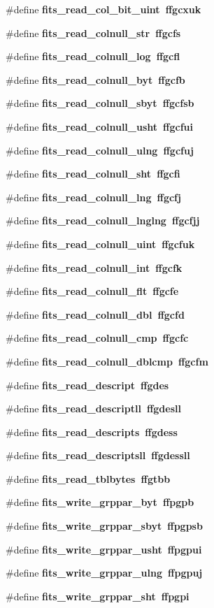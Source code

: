 \begin{CompactItemize}
\item 
\#define \bf{fits\_\-read\_\-col\_\-bit\_\-uint}~ffgcxuk
\item 
\#define \bf{fits\_\-read\_\-colnull\_\-str}~ffgcfs
\item 
\#define \bf{fits\_\-read\_\-colnull\_\-log}~ffgcfl
\item 
\#define \bf{fits\_\-read\_\-colnull\_\-byt}~ffgcfb
\item 
\#define \bf{fits\_\-read\_\-colnull\_\-sbyt}~ffgcfsb
\item 
\#define \bf{fits\_\-read\_\-colnull\_\-usht}~ffgcfui
\item 
\#define \bf{fits\_\-read\_\-colnull\_\-ulng}~ffgcfuj
\item 
\#define \bf{fits\_\-read\_\-colnull\_\-sht}~ffgcfi
\item 
\#define \bf{fits\_\-read\_\-colnull\_\-lng}~ffgcfj
\item 
\#define \bf{fits\_\-read\_\-colnull\_\-lnglng}~ffgcfjj
\item 
\#define \bf{fits\_\-read\_\-colnull\_\-uint}~ffgcfuk
\item 
\#define \bf{fits\_\-read\_\-colnull\_\-int}~ffgcfk
\item 
\#define \bf{fits\_\-read\_\-colnull\_\-flt}~ffgcfe
\item 
\#define \bf{fits\_\-read\_\-colnull\_\-dbl}~ffgcfd
\item 
\#define \bf{fits\_\-read\_\-colnull\_\-cmp}~ffgcfc
\item 
\#define \bf{fits\_\-read\_\-colnull\_\-dblcmp}~ffgcfm
\item 
\#define \bf{fits\_\-read\_\-descript}~ffgdes
\item 
\#define \bf{fits\_\-read\_\-descriptll}~ffgdesll
\item 
\#define \bf{fits\_\-read\_\-descripts}~ffgdess
\item 
\#define \bf{fits\_\-read\_\-descriptsll}~ffgdessll
\item 
\#define \bf{fits\_\-read\_\-tblbytes}~ffgtbb
\item 
\#define \bf{fits\_\-write\_\-grppar\_\-byt}~ffpgpb
\item 
\#define \bf{fits\_\-write\_\-grppar\_\-sbyt}~ffpgpsb
\item 
\#define \bf{fits\_\-write\_\-grppar\_\-usht}~ffpgpui
\item 
\#define \bf{fits\_\-write\_\-grppar\_\-ulng}~ffpgpuj
\item 
\#define \bf{fits\_\-write\_\-grppar\_\-sht}~ffpgpi
\item 

\end{CompactItemize}
